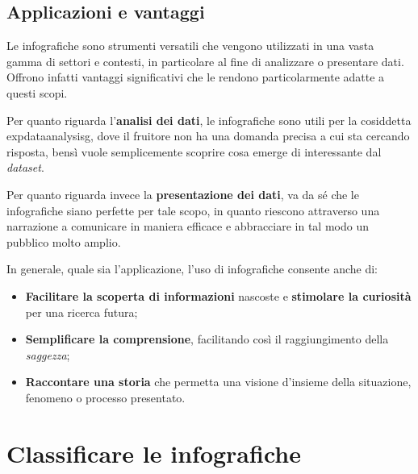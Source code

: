 \subsection{Applicazioni e vantaggi}
Le infografiche sono strumenti versatili che vengono utilizzati in una vasta gamma di settori e contesti, in particolare al fine 
di analizzare o presentare dati. Offrono infatti vantaggi significativi che le rendono particolarmente adatte a questi scopi.

Per quanto riguarda l'\textbf{analisi dei dati}, le infografiche sono utili per la cosiddetta \gls{expdataanalysisg}, dove il fruitore non ha una domanda precisa a cui sta cercando risposta, bensì 
vuole semplicemente scoprire cosa emerge di interessante dal \emph{dataset}.

Per quanto riguarda invece la \textbf{presentazione dei dati}, va da sé che le infografiche siano perfette per tale scopo, in quanto riescono attraverso una narrazione a comunicare in maniera efficace 
e abbracciare in tal modo un pubblico molto amplio.

\bigskip
\noindent In generale, quale sia l'applicazione, l'uso di infografiche consente anche di:
\begin{itemize}
    \item \textbf{Facilitare la scoperta di informazioni} nascoste e \textbf{stimolare la curiosità} per una ricerca futura;
    \item \textbf{Semplificare la comprensione}, facilitando così il raggiungimento della \emph{saggezza};
    \item \textbf{Raccontare una storia} che permetta una visione d'insieme della situazione, fenomeno o processo presentato.
\end{itemize}



\section{Classificare le infografiche}
